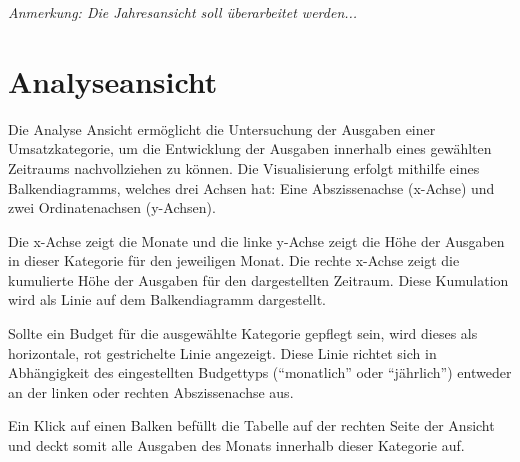 \textit{Anmerkung: Die Jahresansicht soll überarbeitet werden...}

\section{Analyseansicht}

Die Analyse Ansicht ermöglicht die Untersuchung der Ausgaben einer Umsatzkategorie, um die Entwicklung der Ausgaben innerhalb eines gewählten Zeitraums nachvollziehen zu können. Die Visualisierung erfolgt mithilfe eines Balkendiagramms, welches drei Achsen hat: Eine Abszissenachse (x-Achse) und zwei Ordinatenachsen (y-Achsen). 

Die x-Achse zeigt die Monate und die linke y-Achse zeigt die Höhe der Ausgaben in dieser Kategorie für den jeweiligen Monat. Die rechte x-Achse zeigt die kumulierte Höhe der Ausgaben für den dargestellten Zeitraum. Diese Kumulation wird als Linie auf dem Balkendiagramm dargestellt.   

Sollte ein Budget für die ausgewählte Kategorie gepflegt sein, wird dieses als horizontale, rot gestrichelte Linie angezeigt. Diese Linie richtet sich in Abhängigkeit des eingestellten Budgettyps ("`monatlich"' oder "`jährlich"') entweder an der linken oder rechten Abszissenachse aus. 

Ein Klick auf einen Balken befüllt die Tabelle auf der rechten Seite der Ansicht und deckt somit alle Ausgaben des Monats innerhalb dieser Kategorie auf.
